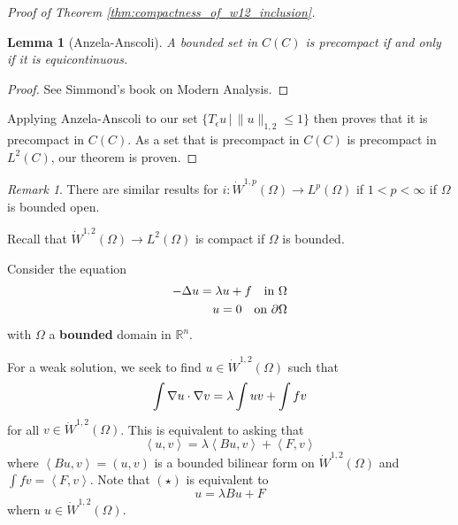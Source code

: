 \documentclass[10pt, oneside, reqno]{amsart}
\theoremstyle{plain}%
\newtheorem{lem}[thm]{Lemma}
\numberwithin{equation}{section}
\theoremstyle{definition}
\theoremstyle{remark}
\newtheorem*{rem}{Remark}
\newcommand{\given}{ \, | \,}
\newcommand{\R}{\mathbb{R}}
\newcommand{\iprod}[1]{\left\langle #1 \right\rangle}
\begin{document}
\begin{proof}[Proof of Theorem \ref{thm:compactness_of_w12_inclusion}]
\begin{lem}[Anzela-Anscoli]
	A bounded set in $C(C)$ is precompact if and only if it is equicontinuous.
\end{lem}
\begin{proof}
	See Simmond's book on Modern Analysis.
\end{proof}

Applying Anzela-Anscoli to our set $\{ T_\epsilon u \given \| u \|_{1, 2} \leq 1 \}$ then proves that it is precompact in $C(C)$.  As a set that is precompact in $C(C)$ is precompact in $L^2(C)$, our theorem is proven.
\end{proof}


\begin{rem}
	There are similar results for $i : \dot W^{1, p}(\Omega) \rightarrow L^p(\Omega)$ if $1 < p < \infty$ if $\Omega$ is bounded open.  
\end{rem}

Recall that $\dot W^{1, 2}(\Omega) \rightarrow L^2(\Omega)$ is compact if $\Omega$ is bounded.

Consider the equation \begin{align}
	\label{eq:eigenvalue_equation}
	-\Delta u = \lambda u + f \quad \text{in $\Omega$} \\
	u = 0 \quad \text{on $\partial \Omega$} \notag
\end{align} with $\Omega$ a \textbf{bounded} domain in $\R^n$.  

For a weak solution, we seek to find $u \in \dot W^{1, 2}(\Omega)$ such that \[
	\int \nabla u \cdot \nabla v = \lambda \int u v + \int fv 
\] for all $v \in \dot W^{1, 2}(\Omega)$.  This is equivalent to asking that \[
	\iprod{u, v} = \lambda \iprod{Bu, v} + \iprod{F, v} \tag{$\star$}
\]  where $\iprod{Bu, v} = (u, v)$ is a bounded bilinear form on $\dot W^{1, 2}(\Omega)$ and $\int fv = \iprod{F, v}$.  Note that $(\star)$ is equivalent to \[
	u = \lambda Bu + F \tag{$\star \star$}
\] whern $u \in \dot W^{1, 2}(\Omega)$.  
\end{document}
